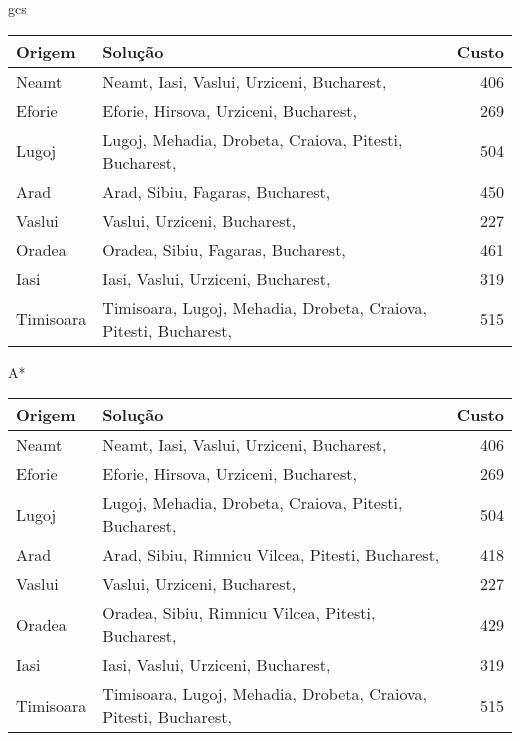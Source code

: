 gcs
\begin{tabular}{llr}
\hline
Origem & Solução & Custo \\
\hline
Neamt & Neamt, Iasi, Vaslui, Urziceni, Bucharest,  & 406 \\
\hline
Eforie & Eforie, Hirsova, Urziceni, Bucharest,  & 269 \\
\hline
Lugoj & Lugoj, Mehadia, Drobeta, Craiova, Pitesti, Bucharest,  & 504 \\
\hline
Arad & Arad, Sibiu, Fagaras, Bucharest,  & 450 \\
\hline
Vaslui & Vaslui, Urziceni, Bucharest,  & 227 \\
\hline
Oradea & Oradea, Sibiu, Fagaras, Bucharest,  & 461 \\
\hline
Iasi & Iasi, Vaslui, Urziceni, Bucharest,  & 319 \\
\hline
Timisoara & Timisoara, Lugoj, Mehadia, Drobeta, Craiova, Pitesti, Bucharest,  & 515 \\
\hline
\end{tabular}
\hline

A*
\begin{tabular}{llr}
\hline
Origem & Solução & Custo \\
\hline
Neamt & Neamt, Iasi, Vaslui, Urziceni, Bucharest,  & 406 & \\
\hline
Eforie & Eforie, Hirsova, Urziceni, Bucharest,  & 269 & \\
\hline
Lugoj & Lugoj, Mehadia, Drobeta, Craiova, Pitesti, Bucharest,  & 504 & \\
\hline
Arad & Arad, Sibiu, Rimnicu Vilcea, Pitesti, Bucharest,  & 418 & \\
\hline
Vaslui & Vaslui, Urziceni, Bucharest,  & 227 & \\
\hline
Oradea & Oradea, Sibiu, Rimnicu Vilcea, Pitesti, Bucharest,  & 429 & \\
\hline
Iasi & Iasi, Vaslui, Urziceni, Bucharest,  & 319 & \\
\hline
Timisoara & Timisoara, Lugoj, Mehadia, Drobeta, Craiova, Pitesti, Bucharest,  & 515 & \\
\hline
\end{tabular}
\hline

